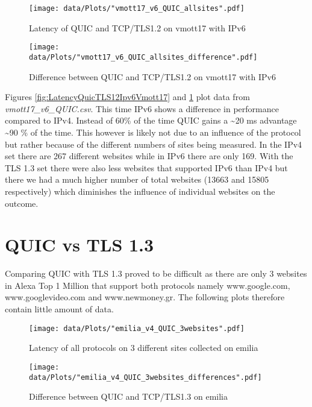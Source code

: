 \begin{figure}[!thb]
	\centering
	\begin{minipage}{.45\textwidth}
		\centering
		\texttt{[image: data/Plots/"vmott17\_v6\_QUIC\_allsites".pdf]}
		\caption{Latency of QUIC and TCP/TLS1.2 on vmott17 with IPv6}
  		\label{fig:LatencyQuicTLS12Ipv6Vmott17}
  	\end{minipage}%
  	\hspace{0.5cm}
  	\begin{minipage}{.45\textwidth}
  		\centering
  		\texttt{[image: data/Plots/"vmott17\_v6\_QUIC\_allsites\_difference".pdf]}
		\caption{Difference between QUIC and TCP/TLS1.2 on vmott17 with IPv6}
  		\label{fig:DiffQuicTLS12Ipv6Vmott17}
  	\end{minipage}
\end{figure}

Figures \ref{fig:LatencyQuicTLS12Ipv6Vmott17} and \ref{fig:DiffQuicTLS12Ipv6Vmott17} plot data from \textit{vmott17\_v6\_QUIC.csv}.
This time IPv6 shows a difference in performance compared to IPv4. Instead of 60\% of the time QUIC gains a \textasciitilde 20 ms advantage \textasciitilde 90 \% of the time.
This however is likely not due to an influence of the protocol but rather because of the different numbers of sites being measured.
In the IPv4 set there are 267 different websites while in IPv6 there are only 169.
With the TLS 1.3 set there were also less websites that supported IPv6 than IPv4 but there we had a much higher number of total websites (13663 and 15805 respectively) which diminishes the influence of individual websites on the outcome.


\section{QUIC vs TLS 1.3}
\label{section:QUIC_vs_TLS_1.3}

Comparing QUIC with TLS 1.3 proved to be difficult as there are only 3 websites in Alexa Top 1 Million that support both protocols namely www.google.com,\\
www.googlevideo.com and www.newmoney.gr.
The following plots therefore contain little amount of data.

\begin{figure}[!thb]
	\centering
	\begin{minipage}{.45\textwidth}
		\centering		
		\texttt{[image: data/Plots/"emilia\_v4\_QUIC\_3websites".pdf]}
		\caption{Latency of all protocols on 3 different sites collected on emilia}
  		\label{fig:LatencyAllProtocolsThreeSitesEmilia}
  	\end{minipage}%
  	\hspace{0.5cm}
  	\begin{minipage}{.45\textwidth}
		\centering
		\texttt{[image: data/Plots/"emilia\_v4\_QUIC\_3websites\_differences".pdf]}
		\caption{Difference between QUIC and TCP/TLS1.3 on emilia}
  		\label{fig:DiffQuicTLS13emilia}
		\end{minipage}
\end{figure}

